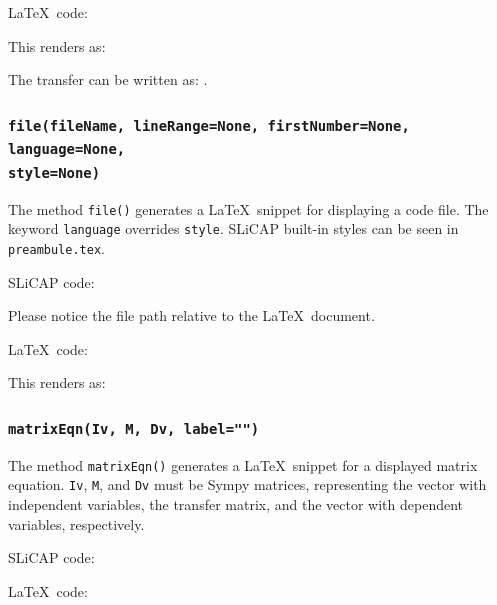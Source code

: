 \documentclass[a4paper,12pt]{article}
\begin{document}


\LaTeX$\,$ code:



This renders as:

The transfer can be written as:
.

\subsubsection{\texttt{file(fileName, lineRange=None, firstNumber=None, language=None, \\ style=None)}}

The method {\texttt{file()}} generates a \LaTeX$\,$ snippet for displaying a code file. The keyword {\texttt{language}} overrides {\texttt{style}}. SLiCAP built-in styles can be seen in {\texttt{preambule.tex}}.

SLiCAP code:



Please notice the file path relative to the \LaTeX$\,$ document.

\LaTeX$\,$ code:



This renders as:



\subsubsection{\texttt{matrixEqn(Iv, M, Dv, label="")}}

The method {\texttt{matrixEqn()}} generates a \LaTeX$\,$ snippet for a displayed matrix equation.
\texttt{Iv}, \texttt{M}, and \texttt{Dv} must be Sympy matrices, representing the vector with independent variables, the transfer matrix, and the vector with dependent variables, respectively.

SLiCAP code:



\LaTeX$\,$ code:


\end{document}
